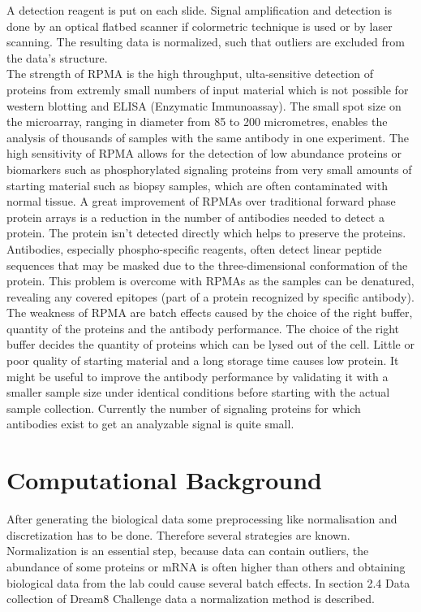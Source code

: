 A detection reagent is put on each slide. Signal amplification and detection is done by an optical flatbed scanner if colormetric technique is used or by laser scanning. The resulting data is normalized, such that outliers are excluded from the data's structure.\\

The strength of RPMA is the high throughput, ulta-sensitive detection of proteins from extremly small numbers of input material which is not possible for western blotting and \gls{ELISA} (Enzymatic Immunoassay). The small spot size on the microarray, ranging in diameter from 85 to 200 micrometres, enables the analysis of thousands of samples with the same antibody in one experiment. The high sensitivity of RPMA allows for the detection of low abundance proteins or biomarkers such as phosphorylated signaling proteins from very small amounts of starting material such as biopsy samples, which are often contaminated with normal tissue. A great improvement of RPMAs over traditional forward phase protein arrays is a reduction in the number of antibodies needed to detect a protein. The protein isn't detected directly which helps to preserve the proteins. Antibodies, especially phospho-specific reagents, often detect linear peptide sequences that may be masked due to the three-dimensional conformation of the protein. This problem is overcome with RPMAs as the samples can be denatured, revealing any covered epitopes (part of a protein recognized by specific antibody).\\

The weakness of RPMA are batch effects caused by the choice of the right buffer, quantity of the proteins and the antibody performance.
The choice of the right buffer decides the quantity of proteins which can be lysed out of the cell. Little or poor quality of starting material and a long storage time causes low protein. It might be useful to improve the antibody performance by validating it with a smaller sample size under identical conditions before starting with the actual sample collection. Currently the number of signaling proteins for which antibodies exist to get an analyzable signal is quite small. \\

\section{Computational Background}
After generating the biological data some preprocessing like normalisation and discretization has to be done. Therefore several strategies are known. Normalization is an essential step, because data can contain outliers, the abundance of some proteins or mRNA is often higher than others and obtaining biological data from the lab could cause several batch effects. In section 2.4 Data collection of Dream8 Challenge data a normalization method is described.

